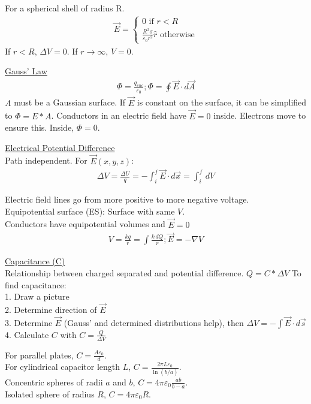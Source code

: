 \documentclass[8pt]{minimal}
\begin{document}
For a spherical shell of radius R.
\begin{gather*}
    \vec{E} = \left\{ \begin{matrix}
        0 \text{ if } r < R\\
        \frac{R^2 \sigma}{\varepsilon_0 r^2}\hat{r} \text{ otherwise}
    \end{matrix} \right.
\end{gather*}
If $r < R$, $\Delta V = 0$. If $r \to \infty$, $V = 0$.

\underline{Gauss' Law}
\begin{gather*}
    \Phi = \frac{q_{enc}}{\varepsilon_0};
    \Phi = \oint \vec{E} \cdot d\vec{A}
\end{gather*}
$A$ must be a Gaussian surface. 
If $\vec{E}$ is constant on the surface, it can be simplified to $\Phi = E*A$.
Conductors in an electric field have $\vec{E} = 0$ inside. 
Electrons move to ensure this. 
Inside, $\Phi = 0$.


\underline{Electrical Potential Difference}\\
Path independent. For $\vec{E}(x,y,z)$:
\begin{gather*}
    \Delta V = \frac{\Delta U}{q} = -\int_{i}^{f} \vec{E}\cdot d\vec{x} = \int_{i}^{f}\,dV
\end{gather*}

Electric field lines go from more positive to more negative voltage.\\
Equipotential surface (ES): Surface with same $V$.\\
Conductors have equipotential volumes and $\vec{E} = 0$
\begin{gather*}
    V = \frac{kq}{r} = \int \frac{k\,dQ}{r};
    \vec{E} = -\nabla V
\end{gather*}


\underline{Capacitance (C)}\\
Relationship between charged separated and potential difference. $Q = C*\Delta V$
To find capacitance:\\
1. Draw a picture\\
2. Determine direction of $\vec{E}$\\
3. Determine $\vec{E}$ (Gauss' and determined distributions help), then $\Delta V = -\int \vec{E}\cdot d\vec{s}$\\
4. Calculate $C$ with $C = \frac{Q}{\Delta V}$

For parallel plates, $C = \frac{A \varepsilon_0}{d}$.\\
For cylindrical capacitor length $L$, $C = \frac{2\pi L\varepsilon_0}{\ln(b/a)}$.\\
Concentric spheres of radii $a$ and $b$, $C = 4\pi\varepsilon_0\frac{ab}{b - a}$.\\
Isolated sphere of radius $R$, $C = 4\pi\varepsilon_0 R$.
\end{document}
